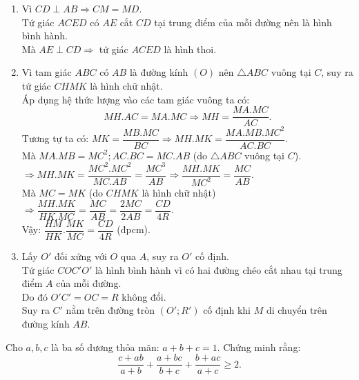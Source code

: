 \begin{ex}
{\begin{enumerate}
\item Vì  $CD \perp  AB \Rightarrow CM = MD$.\\
Tứ giác $ACED$ có $AE$ cắt $CD$ tại trung điểm của mỗi đường nên là hình bình hành.\\
Mà  $AE \perp  CD \Rightarrow$ tứ giác $ACED$ là hình thoi.
\item Vì tam giác $ABC$ có $AB$ là đường kính $(O)$ nên $\triangle ABC$ vuông tại $C$, suy ra tứ giác $CHMK$ là hình chữ nhật.\\
Áp dụng hệ thức lượng vào các tam giác vuông ta có: 
 $$MH. AC = MA. MC \Rightarrow MH = \dfrac{MA. MC}{AC}.$$
Tương tự ta có: $MK = \dfrac{MB. MC}{BC}\Rightarrow MH. MK = \dfrac{MA. MB. MC^2}{AC. BC}$.\\
Mà $MA. MB = MC^2; AC. BC = MC. AB$ (do $\triangle ABC$ vuông tại $C$).\\
$\Rightarrow MH. MK = \dfrac{MC^2. MC^2}{MC. AB}=\dfrac{MC^3}{AB}\Rightarrow \dfrac{MH. MK}{MC^2}=\dfrac{MC}{AB}$.\\
Mà $MC = MK$ (do $CHMK$ là hình chữ nhật)\\
$\Rightarrow \dfrac{MH. MK}{HK. MC}=\dfrac{MC}{AB}=\dfrac{2MC}{2AB}=\dfrac{CD}{4R}.$\\
Vậy: $\dfrac{HM}{HK}.\dfrac{MK}{MC}=\dfrac{CD}{4R}$ (đpcm).
\item Lấy $O'$ đối xứng với $O$ qua $A$, suy ra $O'$ cố định. \\
Tứ giác $COC'O'$ là hình bình hành vì có hai đường chéo cắt nhau tại trung điểm $A$ của mỗi đường. \\
Do đó $O'C' = OC = R$ không đổi.\\
Suy ra $C'$ nằm trên đường tròn $(O'; R')$ cố định khi $M$ di chuyển trên đường kính $AB.$ 
\end{enumerate}
}
\end{ex}

\begin{ex}%
Cho $a, b, c$ là ba số dương thỏa mãn: $a + b + c = 1$. Chứng minh rằng: 
$$\dfrac{c + ab}{a + b} + \dfrac{a + bc}{b + c} + \dfrac{b + ac}{a + c}\ge 2.$$
\end{ex}




